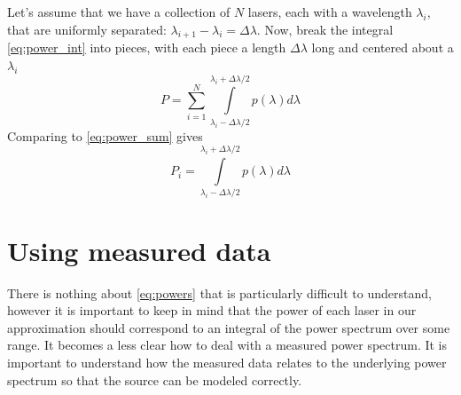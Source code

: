 \documentclass[letterpaper,10pt]{article}
\begin{document}
Let's assume that we have a collection of $N$ lasers, each with a wavelength $\lambda_i$, that are uniformly separated: $\lambda_{i+1} - \lambda_i = \Delta \lambda$. Now, break the integral \ref{eq:power_int} into pieces, with each piece a length $\Delta \lambda$ long and centered about a $\lambda_i$
\begin{equation}
  P = \sum_{i = 1}^N \int\limits_{\lambda_i-\Delta \lambda/2}^{\lambda_i+\Delta \lambda/2} p(\lambda) d\lambda
\end{equation}
Comparing to \ref{eq:power_sum} gives
\begin{equation}
  \label{eq:powers}
  P_i = \int\limits_{\lambda_i-\Delta \lambda/2}^{\lambda_i+\Delta \lambda/2} p(\lambda) d\lambda
\end{equation}

\section{Using measured data}
There is nothing about \ref{eq:powers} that is particularly difficult to understand, however it is important to keep in mind that the power
of each laser in our approximation should correspond to an integral of the power spectrum over some range. It becomes a less clear how to
deal with a measured power spectrum. It is important to understand how the measured data relates to the underlying power spectrum so that the
source can be modeled correctly.
\end{document}
